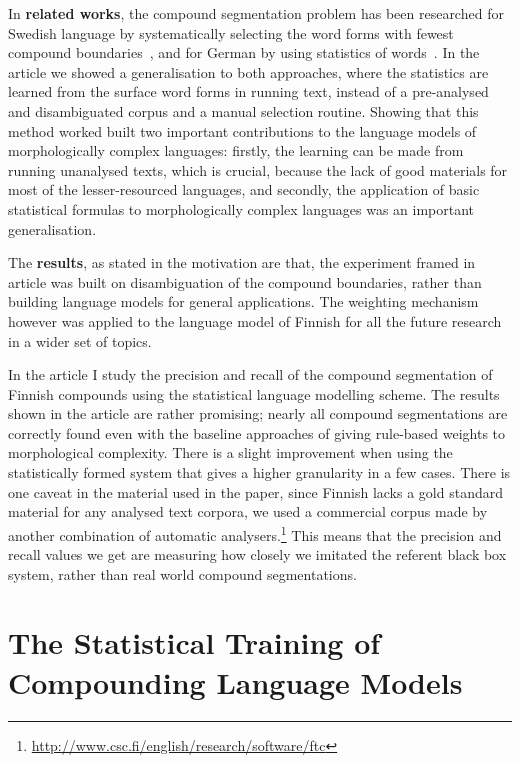 \documentclass[officiallayout]{unihelcompling}
\begin{document}
In \textbf{related works}, the compound segmentation problem has been
researched for Swedish language by systematically selecting the word forms with
fewest compound boundaries~\citep{karlsson1992swetwol}, and for German by using
statistics of words~\citep{schiller2006german}. In the article we showed a
generalisation to both approaches, where the statistics are learned from the
surface word forms in running text, instead of a pre-analysed and disambiguated
corpus and a manual selection routine.  Showing that this method worked built
two important contributions to the language models of morphologically complex
languages: firstly, the learning can be made from running unanalysed texts,
which is crucial, because the lack of good materials for most of the
lesser-resourced languages, and secondly, the application of basic statistical
formulas to morphologically complex languages was an important generalisation.

The \textbf{results}, as stated in the motivation are that, the experiment
framed in article was built on disambiguation of the compound boundaries,
rather than building language models for general applications. The weighting
mechanism however was applied to the language model of Finnish for all the
future research in a wider set of topics.

In the article I study the precision and recall of the compound segmentation of
Finnish compounds using the statistical language modelling scheme. The results
shown in the article are rather promising; nearly all compound segmentations
are correctly found even with the baseline approaches of giving rule-based
weights to morphological complexity. There is a slight improvement when using
the statistically formed system that gives a higher granularity in a few cases.
There is one caveat in the material used in the paper, since Finnish lacks a
gold standard material for any analysed text corpora, we used a commercial
corpus made by another combination of automatic
analysers.\footnote{\url{http://www.csc.fi/english/research/software/ftc}} This
means that the precision and recall values we get are measuring how closely we
imitated the referent black box system, rather than real world compound
segmentations.

\section{The Statistical Training of Compounding Language Models}
\label{sec:training-compounds}
\end{document}
